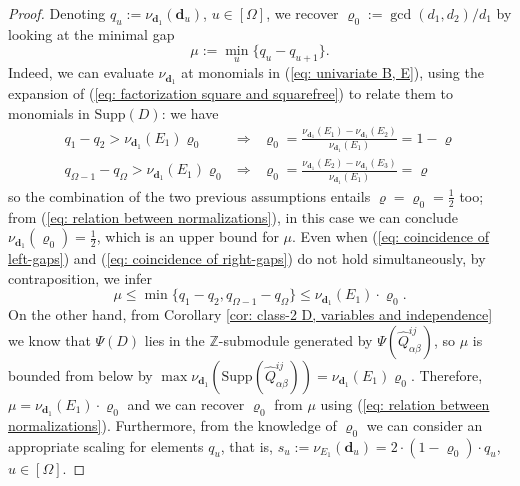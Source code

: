 \documentclass[10pt]{article}
\theoremstyle{remark}%
\theoremstyle{definition}%
\begin{document}
\begin{proof}
Denoting $q_{u}:=\nu_{\mathbf{d}_{1}}(\mathbf{d}_{u})$, $u\in[\Omega]$, we recover $\varrho_{0}:=\gcd(d_{1},d_{2})/d_{1}$ by looking at the minimal gap  
 \begin{equation} 
    \mu:=\min_{u}\{q_{u}-q_{u+1}\}.
    \label{eq: minimal gap in D}
 \end{equation}
Indeed, we can evaluate $\nu_{\mathbf{d}_{1}}$ at monomials in (\ref{eq: univariate B, E}), using the expansion of (\ref{eq: factorization square and squarefree}) to relate them to monomials in $\mathrm{Supp}(D)$: we have 
 \begin{eqnarray}
q_{1}-q_{2} > \nu_{\mathbf{d}_{1}}(E_{1}) \varrho_{0}  & \Rightarrow & \varrho_{0} =  \frac{\nu_{\mathbf{d}_{1}}(E_{1})-\nu_{\mathbf{d}_{1}}(E_{2})}{\nu_{\mathbf{d}_{1}}(E_{1})} = 1-\varrho
\label{eq: coincidence of left-gaps} \\  q_{\Omega-1}-q_{\Omega} > \nu_{\mathbf{d}_{1}}(E_{1}) \varrho_{0} & \Rightarrow & \varrho_{0} = \frac{\nu_{\mathbf{d}_{1}}(E_{2})-\nu_{\mathbf{d}_{1}}(E_{3})}{\nu_{\mathbf{d}_{1}}(E_{1})} = \varrho
\label{eq: coincidence of right-gaps}
 \end{eqnarray}
so the combination of the two previous assumptions entails $\varrho=\varrho_{0}=\frac{1}{2}$ too; from (\ref{eq: relation between normalizations}), in this case we can conclude $\nu_{\mathbf{d}_{1}}(\varrho_{0})=\frac{1}{2}$, which is an upper bound for $\mu$. Even when (\ref{eq: coincidence of left-gaps}) and (\ref{eq: coincidence of right-gaps}) do not hold simultaneously, by contraposition, we infer 
\begin{equation*} 
    \mu \leq \min\{q_{1}-q_{2},q_{\Omega-1}-q_{\Omega}\}\leq\nu_{\mathbf{d}_{1}}(E_{1})\cdot\varrho_{0}.
\end{equation*}
On the other hand, from Corollary \ref{cor: class-2 D, variables and independence} we know that $\Psi(D)$ lies in the $\mathbb{Z}$-submodule generated by $\Psi(\hat{Q}_{\alpha\beta}^{ij})$, so $\mu$ is bounded from below by $\max\nu_{\mathbf{d}_{1}}(\mathrm{Supp}(\hat{Q}_{\alpha\beta}^{ij}))=\nu_{\mathbf{d}_{1}}(E_{1})\varrho_{0}$. Therefore, $\mu=\nu_{\mathbf{d}_{1}}(E_{1})\cdot\varrho_{0}$
and we can recover $\varrho_{0}$ from $\mu$ using (\ref{eq: relation between normalizations}). Furthermore, from the knowledge of $\varrho_{0}$ we can consider an appropriate scaling for elements $q_{u}$, that is, $s_{u}:=\nu_{E_{1}}(\mathbf{d}_{u})=2\cdot (1-\varrho_{0})\cdot q_{u}$, $u\in [\Omega]$. 


\end{proof}
\end{document}
